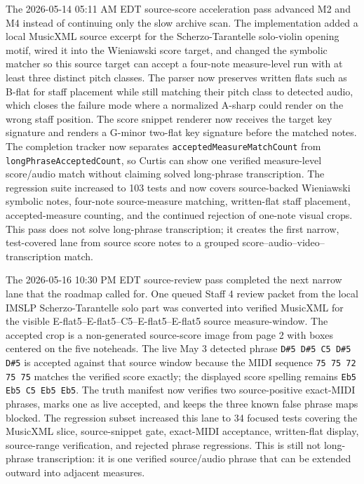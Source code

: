 The 2026-05-14 05:11 AM EDT source-score acceleration pass advanced M2 and M4 instead of continuing only the slow archive scan. The implementation added a local MusicXML source excerpt for the Scherzo-Tarantelle solo-violin opening motif, wired it into the Wieniawski score target, and changed the symbolic matcher so this source target can accept a four-note measure-level run with at least three distinct pitch classes. The parser now preserves written flats such as B-flat for staff placement while still matching their pitch class to detected audio, which closes the failure mode where a normalized A-sharp could render on the wrong staff position. The score snippet renderer now receives the target key signature and renders a G-minor two-flat key signature before the matched notes. The completion tracker now separates \texttt{acceptedMeasureMatchCount} from \texttt{longPhraseAcceptedCount}, so Curtis can show one verified measure-level score/audio match without claiming solved long-phrase transcription. The regression suite increased to 103 tests and now covers source-backed Wieniawski symbolic notes, four-note source-measure matching, written-flat staff placement, accepted-measure counting, and the continued rejection of one-note visual crops. This pass does not solve long-phrase transcription; it creates the first narrow, test-covered lane from source score notes to a grouped score--audio--video--transcription match.

The 2026-05-16 10:30 PM EDT source-review pass completed the next narrow lane that the roadmap called for. One queued Staff 4 review packet from the local IMSLP Scherzo-Tarantelle solo part was converted into verified MusicXML for the visible E-flat5--E-flat5--C5--E-flat5--E-flat5 source measure-window. The accepted crop is a non-generated source-score image from page 2 with boxes centered on the five noteheads. The live May 3 detected phrase \texttt{D\#5 D\#5 C5 D\#5 D\#5} is accepted against that source window because the MIDI sequence \texttt{75 75 72 75 75} matches the verified score exactly; the displayed score spelling remains \texttt{Eb5 Eb5 C5 Eb5 Eb5}. The truth manifest now verifies two source-positive exact-MIDI phrases, marks one as live accepted, and keeps the three known false phrase maps blocked. The regression subset increased this lane to 34 focused tests covering the MusicXML slice, source-snippet gate, exact-MIDI acceptance, written-flat display, source-range verification, and rejected phrase regressions. This is still not long-phrase transcription: it is one verified source/audio phrase that can be extended outward into adjacent measures.

